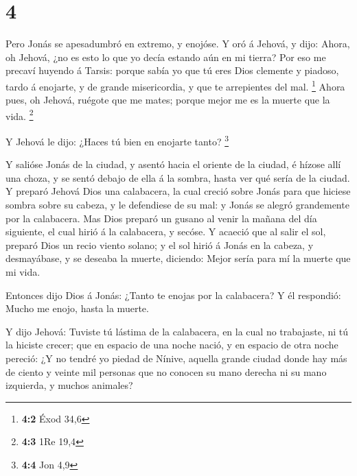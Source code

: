 \hypertarget{section-3}{%
\section{4}\label{section-3}}

 Pero Jonás se apesadumbró en extremo, y enojóse.
 Y oró á Jehová, y dijo: Ahora, oh Jehová, ¿no es esto lo
que yo decía estando aún en mi tierra? Por eso me precaví huyendo á
Tarsis: porque sabía yo que tú eres Dios clemente y piadoso, tardo á
enojarte, y de grande misericordia, y que te arrepientes del mal.
\footnote{\textbf{4:2} Éxod 34,6}  Ahora pues, oh Jehová,
ruégote que me mates; porque mejor me es la muerte que la vida.
\footnote{\textbf{4:3} 1Re 19,4}

 Y Jehová le dijo: ¿Haces tú bien en enojarte tanto?
\footnote{\textbf{4:4} Jon 4,9}

 Y salióse Jonás de la ciudad, y asentó hacia el oriente de
la ciudad, é hízose allí una choza, y se sentó debajo de ella á la
sombra, hasta ver qué sería de la ciudad.  Y preparó Jehová
Dios una calabacera, la cual creció sobre Jonás para que hiciese sombra
sobre su cabeza, y le defendiese de su mal: y Jonás se alegró
grandemente por la calabacera.  Mas Dios preparó un gusano
al venir la mañana del día siguiente, el cual hirió á la calabacera, y
secóse.  Y acaeció que al salir el sol, preparó Dios un
recio viento solano; y el sol hirió á Jonás en la cabeza, y desmayábase,
y se deseaba la muerte, diciendo: Mejor sería para mí la muerte que mi
vida.

 Entonces dijo Dios á Jonás: ¿Tanto te enojas por la
calabacera? Y él respondió: Mucho me enojo, hasta la muerte.

 Y dijo Jehová: Tuviste tú lástima de la calabacera, en la
cual no trabajaste, ni tú la hiciste crecer; que en espacio de una noche
nació, y en espacio de otra noche pereció:  ¿Y no tendré yo
piedad de Nínive, aquella grande ciudad donde hay más de ciento y veinte
mil personas que no conocen su mano derecha ni su mano izquierda, y
muchos animales?
